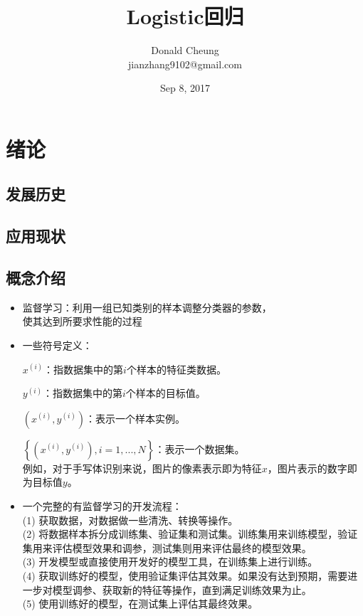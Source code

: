 \documentclass[10pt,a4paper]{ctexbook}
\begin{document}
    \setlength{\baselineskip}{20pt}
    \title{Logistic回归}
    \author{Donald Cheung\\jianzhang9102@gmail.com}
    \date{Sep 8, 2017}
    \maketitle
    \tableofcontents
\fi

\chapter{绪论}
\section{发展历史}
\section{应用现状}
\section{概念介绍}

\begin{itemize}
\item 监督学习：利用一组已知类别的样本调整分类器的参数，\\使其达到所要求性能的过程
\item 一些符号定义：

$x^{(i)}$：指数据集中的第$i$个样本的特征类数据。

$y^{(i)}$：指数据集中的第$i$个样本的目标值。

$\left(x^{(i)},y^{(i)}\right)$：表示一个样本实例。

$\left\{\left(x^{(i)},y^{(i)}\right), i=1,...,N\right\}$：表示一个数据集。
\\例如，对于手写体识别来说，图片的像素表示即为特征$x$，图片表示的数字即为目标值$y$。

\end{itemize}

\begin{itemize}
\item 一个完整的有监督学习的开发流程：
\\(1) 获取数据，对数据做一些清洗、转换等操作。
\\(2) 将数据样本拆分成训练集、验证集和测试集。训练集用来训练模型，验证集用来评估模型效果和调参，测试集则用来评估最终的模型效果。
\\(3) 开发模型或直接使用开发好的模型工具，在训练集上进行训练。
\\(4) 获取训练好的模型，使用验证集评估其效果。如果没有达到预期，需要进一步对模型调参、获取新的特征等操作，直到满足训练效果为止。
\\(5) 使用训练好的模型，在测试集上评估其最终效果。
\end{itemize}
\end{document}
